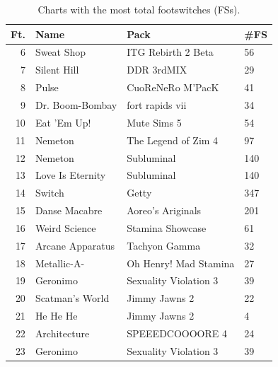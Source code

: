 \documentclass[10pt]{sigplanconf}
\begin{document}
\begin{table}[t]
	\begin{center}
		\small
	\begin{tabular}{r|l|l|l}
		\bf Ft. & \bf Name & \bf Pack & \bf \#FS \\
		\hline
		 6 & Sweat Shop       & ITG Rebirth 2 Beta    &  56 \\
		 7 & Silent Hill      & DDR 3rdMIX            &  29 \\
		 8 & Pulse            & CuoReNeRo M'PacK      &  41 \\
		 9 & Dr. Boom-Bombay  & fort rapids vii       &  34 \\
		10 & Eat 'Em Up!      & Mute Sims 5           &  54 \\
		11 & Nemeton          & The Legend of Zim 4   &  97 \\
		12 & Nemeton          & Subluminal            & 140 \\
		13 & Love Is Eternity & Subluminal            & 140 \\
		14 & Switch           & Getty                 & 347 \\
		15 & Danse Macabre    & Aoreo's Ariginals     & 201 \\
		16 & Weird Science    & Stamina Showcase      &  61 \\
		17 & Arcane Apparatus & Tachyon Gamma         &  32 \\
		18 & Metallic-A-      & Oh Henry! Mad Stamina &  27 \\
		19 & Geronimo         & Sexuality Violation 3 &  39 \\
		20 & Scatman's World  & Jimmy Jawns 2         &  22 \\
		21 & He He He         & Jimmy Jawns 2         &   4 \\
		22 & Architecture     & SPEEEDCOOOORE 4       &  24 \\
		23 & Geronimo         & Sexuality Violation 3 &  39 \\
	\end{tabular}
	\end{center}
	\caption{Charts with the most total footswitches (FSs).}
	\label{tab:chart-fs}
\end{table}
\end{document}
